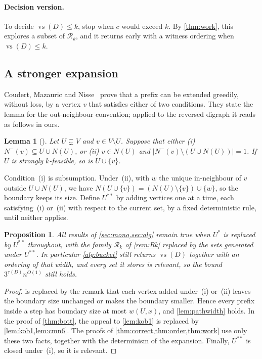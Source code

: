 \documentclass[11pt]{article}
\newtheorem{lemma}[theorem]{Lemma}
\newtheorem{proposition}[theorem]{Proposition}
\theoremstyle{definition}
\newcommand{\Nm}{N^{-}}
\newcommand{\vs}{\operatorname{vs}}
\newcommand{\Rel}{\mathcal{R}}
\newcommand{\cost}{w}
\newcommand{\set}[1]{\{#1\}}
\begin{document}
\paragraph{Decision version.}
To decide $\vs(D)\le k$, stop when $c$ would exceed $k$. By
\cref{thm:work}, this explores a subset of $\Rel_k$, and it returns early
with a witness ordering when $\vs(D)\le k$.

\subsection{A stronger expansion}\label{sec:greedy2}

Coudert, Mazauric and Nisse~\cite[Lemma~6]{CMN14} prove that a prefix can be
extended greedily, without loss, by a vertex $v$ that satisfies either of
two conditions. They state the lemma for the out-neighbour convention;
applied to the reversed digraph it reads as follows in ours.

\begin{lemma}[{\cite[Lemma~6]{CMN14}}]\label{lem:cmn6}
Let $U\subsetneq V$ and $v\in V\setminus U$. Suppose that either
\textup{(i)} $\Nm(v)\subseteq U\cup N(U)$, or \textup{(ii)} $v\in N(U)$ and
$|\Nm(v)\setminus(U\cup N(U))|=1$. If $U$ is strongly $k$-feasible, so is
$U\cup\set v$.
\end{lemma}

Condition~(i) is subsumption. Under~(ii), with $w$ the unique in-neighbour
of $v$ outside $U\cup N(U)$, we have $N(U\cup\set v)=(N(U)\setminus\set
v)\cup\set w$, so the boundary keeps its size. Define $U^{**}$ by adding
vertices one at a time, each satisfying~(i) or~(ii) with respect to the
current set, by a fixed deterministic rule, until neither applies.

\begin{proposition}\label{prop:greedy2}
All results of \cref{sec:mono,sec:alg} remain true when $U^*$ is replaced by
$U^{**}$ throughout, with the family $\Rel_k$ of \cref{rem:Rk} replaced by
the sets generated under $U^{**}$. In particular \cref{alg:bucket} still
returns $\vs(D)$ together with an ordering of that width, and every set it
stores is relevant, so the bound $3^{\tau(D)}n^{O(1)}$ still holds.
\end{proposition}
\begin{proof}
 is replaced by the remark that each vertex added under~(i)
or~(ii) leaves the boundary size unchanged or makes the boundary smaller.
Hence every prefix inside a step has boundary size at most $\cost(U,x)$,
and \cref{lem:pathwidth} holds. In the proof of \cref{thm:bott}, the
appeal to \cref{lem:kob1} is replaced by \cref{lem:kob1,lem:cmn6}. The
proofs of \cref{thm:correct,thm:order,thm:work} use only these two facts,
together with the determinism of the expansion. Finally, $U^{**}$ is closed
under~(i), so it is relevant.
\end{proof}
\end{document}
